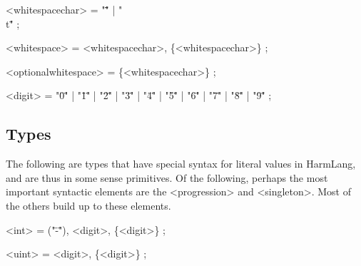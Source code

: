 \documentclass{article}
\begin{document}
\begin{grammar}

<whitespacechar> = "\" \"" | "\"\\t\"" ;

<whitespace> = <whitespacechar>, \{<whitespacechar>\} ;

<optionalwhitespace> = \{<whitespacechar>\} ;



<digit> = "\"0\"" | "\"1\"" | "\"2\"" | "\"3\"" | "\"4\"" | "\"5\"" | "\"6\"" | "\"7\"" | "\"8\"" | "\"9\"" ;




\end{grammar}

\subsection{Types}

The following are types that have special syntax for literal values in HarmLang, and are thus in some sense primitives.  Of the following, perhaps the most important syntactic elements are the <progression> and <singleton>.  Most of the others build up to these elements.

\begin{grammar}

<int> = ("\"-\""), <digit>, \{<digit>\} ;

<uint> = <digit>, \{<digit>\} ;








\end{grammar}
\end{document}
